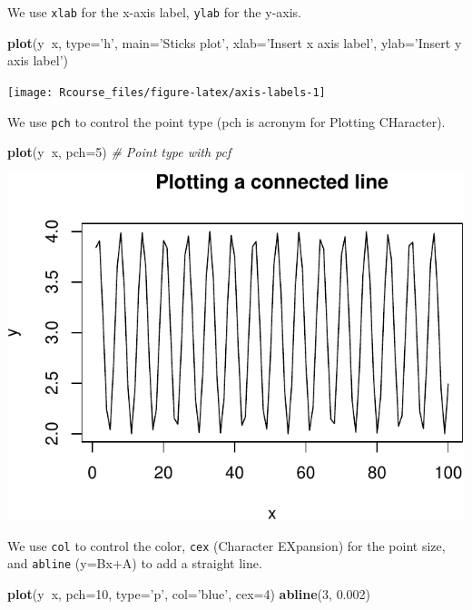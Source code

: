 \documentclass[]{book}
\newenvironment{Shaded}{\begin{snugshade}}{\end{snugshade}}
\newcommand{\CommentTok}[1]{\textcolor[rgb]{0.56,0.35,0.01}{\textit{#1}}}
\newcommand{\DataTypeTok}[1]{\textcolor[rgb]{0.13,0.29,0.53}{#1}}
\newcommand{\DecValTok}[1]{\textcolor[rgb]{0.00,0.00,0.81}{#1}}
\newcommand{\FloatTok}[1]{\textcolor[rgb]{0.00,0.00,0.81}{#1}}
\newcommand{\KeywordTok}[1]{\textcolor[rgb]{0.13,0.29,0.53}{\textbf{#1}}}
\newcommand{\NormalTok}[1]{#1}
\newcommand{\OperatorTok}[1]{\textcolor[rgb]{0.81,0.36,0.00}{\textbf{#1}}}
\newcommand{\StringTok}[1]{\textcolor[rgb]{0.31,0.60,0.02}{#1}}
\theoremstyle{definition}
\theoremstyle{definition}
\theoremstyle{definition}
\theoremstyle{remark}
\begin{document}
We use \texttt{xlab} for the x-axis label, \texttt{ylab} for the y-axis.

\begin{Shaded}
\begin{Highlighting}[]
\KeywordTok{plot}\NormalTok{(y}\OperatorTok{~}\NormalTok{x, }\DataTypeTok{type=}\StringTok{'h'}\NormalTok{, }\DataTypeTok{main=}\StringTok{'Sticks plot'}\NormalTok{, }\DataTypeTok{xlab=}\StringTok{'Insert x axis label'}\NormalTok{, }\DataTypeTok{ylab=}\StringTok{'Insert y axis label'}\NormalTok{) }
\end{Highlighting}
\end{Shaded}

\texttt{[image: Rcourse\_files/figure-latex/axis-labels-1]}

We use \texttt{pch} to control the point type (pch is acronym for Plotting CHaracter).

\begin{Shaded}
\begin{Highlighting}[]
\KeywordTok{plot}\NormalTok{(y}\OperatorTok{~}\NormalTok{x, }\DataTypeTok{pch=}\DecValTok{5}\NormalTok{) }\CommentTok{# Point type with pcf}
\end{Highlighting}
\end{Shaded}

\includegraphics[width=0.5\linewidth]{Rcourse_files/figure-latex/unnamed-chunk-34-1}

We use \texttt{col} to control the color, \texttt{cex} (Character EXpansion) for the point size, and \texttt{abline} (y=Bx+A) to add a straight line.

\begin{Shaded}
\begin{Highlighting}[]
\KeywordTok{plot}\NormalTok{(y}\OperatorTok{~}\NormalTok{x, }\DataTypeTok{pch=}\DecValTok{10}\NormalTok{, }\DataTypeTok{type=}\StringTok{'p'}\NormalTok{, }\DataTypeTok{col=}\StringTok{'blue'}\NormalTok{, }\DataTypeTok{cex=}\DecValTok{4}\NormalTok{) }
\KeywordTok{abline}\NormalTok{(}\DecValTok{3}\NormalTok{, }\FloatTok{0.002}\NormalTok{) }
\end{Highlighting}
\end{Shaded}
\end{document}
